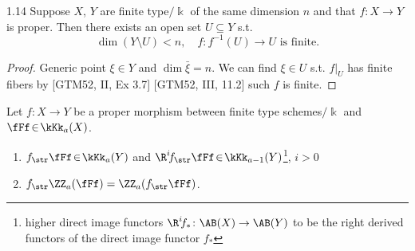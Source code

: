 \begin{lemma}{}{1.14}
	Suppose $X$, $Y$ are finite type$/\Bbbk$ of the same dimension $n$ and that $f\colon X \rightarrow Y$ is proper. Then there exists an open set $U \subseteq Y$ s.t.
	\[
			\dim (Y \setminus U)<n, \quad f\colon f^{-1}(U) \rightarrow U \text{ is finite.}
	\]
\end{lemma}

\begin{proof}
	Generic point $\xi\in Y$ and $\dim\bar{\xi}=n$. We can find $\xi\in U$ s.t. $f|_{U}$ has finite fibers by [GTM52, II, Ex 3.7] [GTM52, III, 11.2] such $f$ is finite.
\end{proof}

\begin{proposition}{}{}
	Let $f\colon X \rightarrow Y$ be a proper morphism between finite type schemes$/\Bbbk$ and $\fFf\!\in\!\kKk_a(X)$.
	\begin{enumerate}
		\item
				$f_{\str} \fFf\!\in\!\kKk_a(Y)$ and $\R^i\!f_{\str} \fFf \!\in\!\kKk_{a-1}(Y)$\footnote{higher direct image functors $\R^i\!f_{*}\colon \AB(X) \to \AB(Y)$ to be the
				right derived functors of the direct image functor $f_*$}, $i>0$
		\item
				$f_{\str} \ZZ_a(\fFf)=\ZZ_a(f_{\str} \fFf)$.
	\end{enumerate}
\end{proposition}

